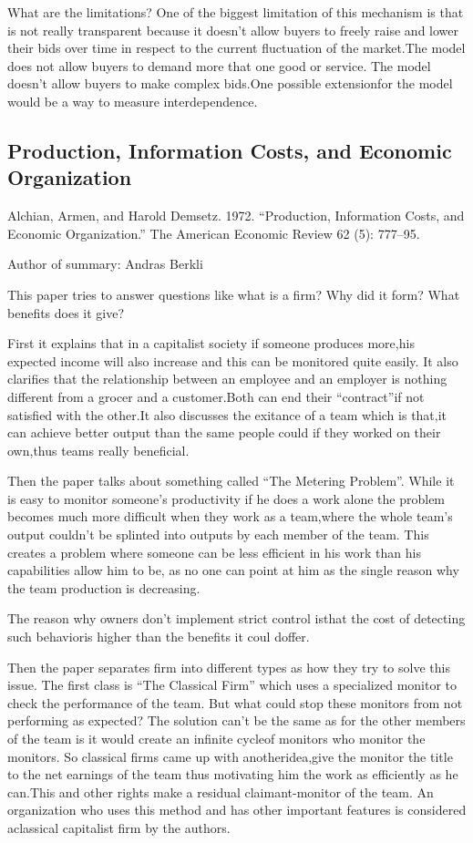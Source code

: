 \documentclass[12pt]{report}
\numberwithin{equation}{section}
\begin{document}
What are the limitations? One of the biggest limitation of this mechanism is that is not really transparent because it doesn’t allow buyers to freely raise and lower their bids over time in respect to the current fluctuation of the market.The model does not allow buyers to demand more that one good or service. The model doesn’t allow buyers to make complex bids.One possible extensionfor the model would be a way to measure interdependence. 

\newpage

\subsection{Production, Information Costs, and Economic Organization}

Alchian, Armen, and Harold Demsetz. 1972. “Production, Information Costs, and Economic Organization.” The American Economic Review 62 (5): 777–95. 

Author of summary: Andras Berkli

This paper tries to answer questions like what is a firm? Why did it form? What benefits does it give?

First  it  explains  that  in a  capitalist  society  if  someone  produces  more,his  expected  income  will  also increase and  this  can  be  monitored  quite  easily.  It  also  clarifies  that  the  relationship  between  an employee  and  an  employer  is  nothing  different  from  a  grocer  and  a  customer.Both  can  end  their “contract”if not satisfied with the other.It also discusses the exitance of a team which is that,it can achieve  better  output  than  the  same  people  could  if  they  worked  on  their  own,thus  teams  really beneficial. 

Then  the  paper  talks  about something called “The Metering Problem”. While it is easy  to  monitor someone’s productivity if he does a work alone the problem becomes much more difficult when they work as a team,where the whole team’s output couldn’t be splinted into outputs by each member of the team. This creates a problem where someone can be less efficient in his work than his capabilities allow him to be, as no one can point at him as the single reason why the team production is decreasing. 

The reason why owners don’t implement strict control isthat the cost of detecting such behavioris higher than the benefits it coul doffer.

Then the paper separates firm into different types as how they try to solve this issue. The first class is “The Classical Firm” which uses a specialized monitor to check the performance of the team. But what could stop these monitors from not performing as expected? The solution can’t be the same as for the other members of the team is it would create an infinite cycleof monitors who monitor the monitors. So classical firms came up with anotheridea,give the monitor the title to the net earnings of the team thus motivating him the work as efficiently as he can.This and other rights make a residual claimant-monitor  of  the  team. An  organization  who  uses  this  method  and  has  other  important  features  is considered aclassical capitalist firm by the authors. 
\end{document}
